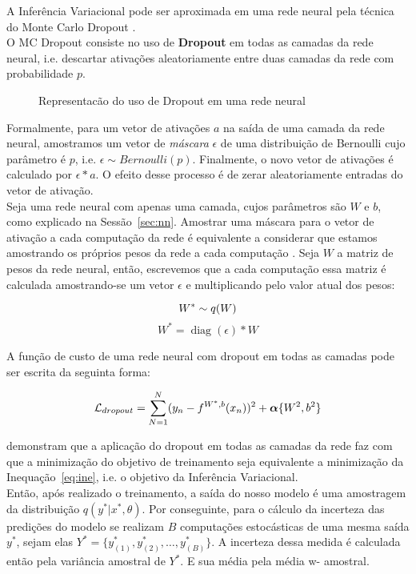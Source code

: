 A Inferência Variacional pode ser aproximada em uma rede neural pela técnica do Monte Carlo Dropout \citep{dropbayes}. \\

O MC Dropout consiste no uso de \textbf{Dropout} em todas as camadas da rede
neural, i.e. descartar ativações aleatoriamente entre duas camadas da rede com
probabilidade $p$.\\

\begin{figure}
  \centering
  
  \label{fig:dropout}
  \caption{Representacão do uso de Dropout em uma rede neural}
\end{figure}

Formalmente, para um vetor de ativações $a$ na saída de uma
camada da rede neural, amostramos um vetor de \textit{máscara} $\epsilon$ de uma
distribuição de Bernoulli cujo parâmetro é $p$, i.e. $\epsilon \sim Bernoulli(p)$.
Finalmente, o novo vetor de ativações é calculado por $\epsilon * a$. O efeito desse
processo é de zerar aleatoriamente entradas do vetor de ativação.
\\

Seja uma rede neural com apenas uma camada, cujos parâmetros são $W$ e $b$, como explicado na Sessão~\ref{sec:nn}. Amostrar uma máscara para o vetor de ativação a cada computação da rede é equivalente a considerar que estamos amostrando os próprios pesos da rede a cada computação \cite{dropbayes}. Seja $W$ a matriz de pesos da rede neural, então, escrevemos que a cada computação essa matriz é calculada amostrando-se um vetor $\epsilon$ e multiplicando pelo valor atual dos pesos: \\

\newcommand{\diag}{\mathop{\mathrm{diag}}}

$$    W^*   \sim \mathnormal{q}(W) $$
$$    W^*  = \diag(\epsilon) * W $$


A função de custo de uma rede neural com dropout em todas as camadas pode ser escrita da seguinta forma:

\[     \mathcal{L}_{dropout} = \sum^N_{N=1} (y_n - \mathnormal{f}^{W^*,b}(x_n))^2 + \boldsymbol{\alpha}\{W^2,b^2\} \]


\cite{dropbayes} demonstram que a aplicação do dropout em todas as camadas da rede faz com que a minimização
do objetivo de treinamento seja equivalente a minimização da Inequação~\ref{eq:ine}, i.e. o objetivo da Inferência Variacional.\\

Então, após realizado o treinamento, a saída do nosso modelo é uma amostragem da distribuição $q(y^* | x^* , \theta)$.
Por conseguinte, para o cálculo da incerteza das predições do modelo se realizam $B$ computações estocásticas de uma mesma
saída $y^*$, sejam elas $Y^* = \{y^*_{(1)},y^*_{(2)}, \dots , y^*_{(B)}\}$. A incerteza
dessa medida é calculada então pela variância amostral de $Y^*$. E sua média pela média w- amostral.



